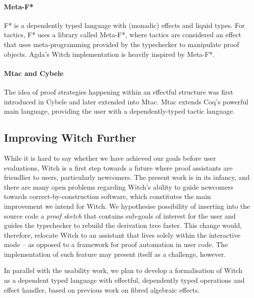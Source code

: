 \documentclass[sigconfl]{acmart}
\begin{document}
\paragraph{Meta-F*} F* is a dependently typed language with (monadic) effects and liquid
types. For tactics, F* uses a library called Meta-F*, where tactics are
considered an effect that uses meta-programming provided by the typechecker to
manipulate proof objects. Agda's Witch implementation is heavily inspired by Meta-F*.

\paragraph{Mtac and Cybele} The idea of proof strategies happening within an
effectful structure was first introduced in Cybele and later extended into Mtac.
Mtac extends Coq's powerful main language, providing the user with a
dependently-typed tactic language.

\subsection{Improving Witch Further}
While it is hard to say whether we have achieved our goals before user
evaluations, Witch is a first step towards a future where proof assistants are
friendlier to users, particularly newcomers. The present work is in its
infancy, and there are many open problems regarding Witch's ability to guide newcomers
towards correct-by-construction software, which constitutes the main improvement
we intend for Witch. We hypothesise possibility of inserting into the source
code a  \textit{proof sketch} that contains sub-goals of interest for the user and guides the
typechecker to rebuild the derivation tree faster. This change would, therefore,
relocate Witch to an assistant that lives solely
within the interactive mode -- as opposed to a framework for proof
automation in user code. The implementation of such feature may present itself
as a challenge, however.

In parallel with the usability work, we plan to develop a formalisation of Witch
as a dependent typed language with effectful, dependently typed operations and
effect handler, based on previous work on fibred algebraic effects.
\end{document}
